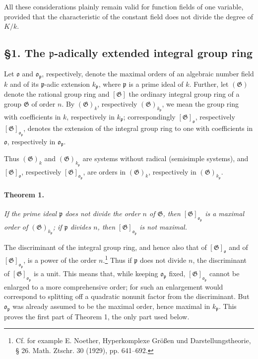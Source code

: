 \documentclass[11pt]{article}
\providecommand{\frako}{\mathfrak o}
\providecommand{\frakp}{\mathfrak p}
\providecommand{\Gg}{\mathfrak G}
\begin{document}
All these considerations plainly remain valid for function fields of one variable, provided that the characteristic of the constant field does not divide the degree of \(K/k\).

\subsection*{§1. The \(\frakp\)-adically extended integral group ring}

Let \(\frako\) and \(\frako_\frakp\), respectively, denote the maximal orders of an algebraic number field \(k\) and of its \(\frakp\)-adic extension \(k_\frakp\), where \(\frakp\) is a prime ideal of \(k\). Further, let \((\Gg)\) denote the rational group ring and \([\Gg]\) the ordinary integral group ring of a group \(\Gg\) of order \(n\). By \((\Gg)_k\), respectively \((\Gg)_{k_\frakp}\), we mean the group ring with coefficients in \(k\), respectively in \(k_\frakp\); correspondingly \([\Gg]_\frako\), respectively \([\Gg]_{\frako_\frakp}\), denotes the extension of the integral group ring to one with coefficients in \(\frako\), respectively in \(\frako_\frakp\).

Thus \((\Gg)_k\) and \((\Gg)_{k_\frakp}\) are systems without radical (semisimple systems), and \([\Gg]_\frako\), respectively \([\Gg]_{\frako_\frakp}\), are orders in \((\Gg)_k\), respectively in \((\Gg)_{k_\frakp}\).

\paragraph{Theorem 1.}
\emph{If the prime ideal \(\frakp\) does not divide the order \(n\) of \(\Gg\), then \([\Gg]_{\frako_\frakp}\) is a maximal order of \((\Gg)_{k_\frakp}\); if \(\frakp\) divides \(n\), then \([\Gg]_{\frako_\frakp}\) is not maximal.}

The discriminant of the integral group ring, and hence also that of \([\Gg]_\frako\) and of \([\Gg]_{\frako_\frakp}\), is a power of the order \(n\).\footnote{Cf. for example E. Noether, Hyperkomplexe Größen und Darstellungstheorie, § 26. Math. Ztschr. 30 (1929), pp. 641--692.} Thus if \(\frakp\) does not divide \(n\), the discriminant of \([\Gg]_{\frako_\frakp}\) is a unit. This means that, while keeping \(\frako_\frakp\) fixed, \([\Gg]_{\frako_\frakp}\) cannot be enlarged to a more comprehensive order; for such an enlargement would correspond to splitting off a quadratic nonunit factor from the discriminant. But \(\frako_\frakp\) was already assumed to be the maximal order, hence maximal in \(k_\frakp\). This proves the first part of Theorem 1, the only part used below.
\end{document}
